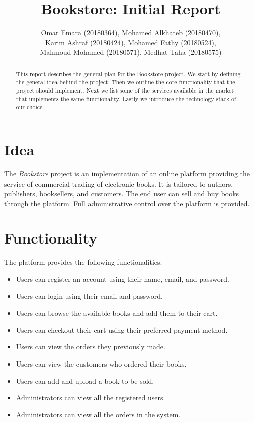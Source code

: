 \documentclass{article}
\begin{document}
\title{Bookstore: Initial Report}
\author{
Omar Emara (20180364), Mohamed Alkhateb (20180470), \\
Karim Ashraf (20180424), Mohamed Fathy (20180524), \\
Mahmoud Mohamed (20180571), Medhat Taha (20180575)
}
\maketitle

\begin{abstract}
This report describes the general plan for the Bookstore project.
We start by defining the general idea behind the project.
Then we outline the core functionality that the project should implement.
Next we list some of the services available in the market that implements the same functionality.
Lastly we introduce the technology stack of our choice.
\end{abstract}

\section{Idea}

The \emph{Bookstore} project is an implementation of an online platform providing the service of
commercial trading of electronic books. It is tailored to authors, publishers, booksellers, and
customers. The end user can sell and buy books through the platform. Full administrative control
over the platform is provided.

\section{Functionality}

The platform provides the following functionalities:

\begin{itemize}
\item Users can register an account using their name, email, and password.
\item Users can login using their email and password.
\item Users can browse the available books and add them to their cart.
\item Users can checkout their cart using their preferred payment method.
\item Users can view the orders they previously made.
\item Users can view the customers who ordered their books.
\item Users can add and upload a book to be sold.
\item Administrators can view all the registered users.
\item Administrators can view all the orders in the system.
\end{itemize}
\end{document}
